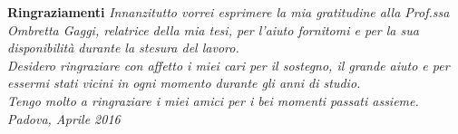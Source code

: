 \textbf{Ringraziamenti}
\textit{Innanzitutto vorrei esprimere la mia gratitudine alla Prof.ssa Ombretta Gaggi, relatrice della mia tesi, per l'aiuto fornitomi e per la sua disponibilità durante la stesura del lavoro.}\\

\textit{Desidero ringraziare con affetto i miei cari per il sostegno, il grande aiuto e per essermi stati vicini in ogni momento durante gli anni di studio.}\\

\textit{Tengo molto a ringraziare i miei amici per i bei momenti passati assieme.}\\

\textit{Padova, Aprile 2016} 